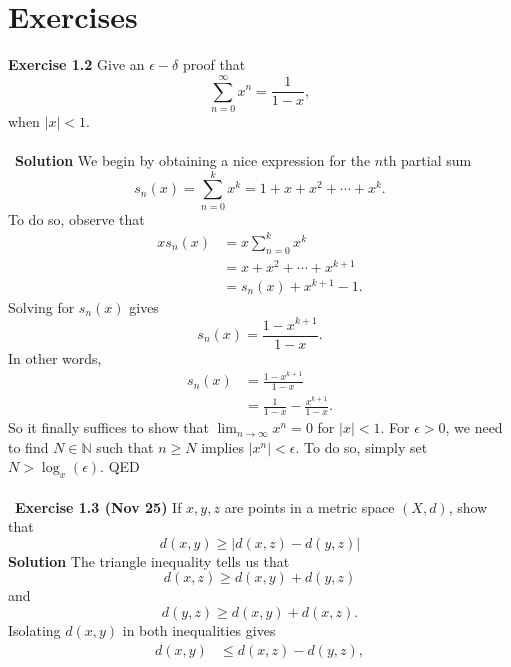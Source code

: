 \documentclass[12 pt]{article}
\newcommand{\N}{\mathbb{N}}
\numberwithin{equation}{section}
\begin{document}
{\section{Exercises}



\textbf{Exercise 1.2} Give an $\epsilon-\delta$ proof that \begin{equation*}
\sum_{n=0} ^\infty x^n = \frac{1}{1 - x},
\end{equation*}
when $|x| < 1$.\\
\\
\
\textbf{Solution} We begin by obtaining a nice expression for the $n$th partial sum \begin{equation*}
s_n (x) = \sum_{n=0} ^k x^k = 1 + x + x^2 + \cdots + x^k.
\end{equation*}
To do so, observe that \begin{align*}
x s_n (x)& = x \sum_{n=0} ^k x^k \\
\ & = x + x^2 + \cdots + x^{k+1} \\
\ & = s_n (x) + x^{k+1} - 1.
\end{align*}
Solving for $s_n(x)$ gives \begin{equation*}
s_n(x) = \frac{1- x^{k+1} }{1 - x}.
\end{equation*}
In other words, \begin{align*}
s_n(x) & = \frac{1- x^{k+1} }{1 - x} \\
\ & = \frac{1}{1 - x} - \frac{x^{k+1}}{1 - x}.
\end{align*}
So it finally suffices to show that $\lim_{n \to \infty} x^n = 0$ for $|x| < 1$. For $\epsilon > 0$, we need to find $N \in \N$ such that $n \geq N$ implies $|x^n| < \epsilon$. To do so, simply set $N > \log_x (\epsilon)$. QED\\
\\
\
\textbf{Exercise 1.3 (Nov 25)} If $x, y, z$ are points in a metric space $(X, d)$, show that \begin{equation*}
d(x,y) \geq |d(x,z) - d(y,z)|
\end{equation*}
\textbf{Solution} The triangle inequality tells us that \begin{equation*}
d(x, z) \geq d(x, y) + d(y, z)
\end{equation*}
and \begin{equation*}
d(y, z) \geq d(x, y) + d(x, z).
\end{equation*}
Isolating $d(x,y)$ in both inequalities gives \begin{align*}
d(x,y) & \leq d(x,z) - d(y,z), \\

\end{align*}}
\end{document}
